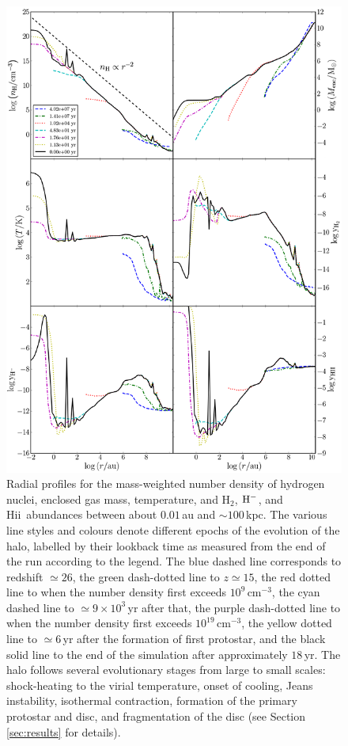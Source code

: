 \documentclass[useAMS,usenatbib]{mnras}
\newcommand{\cmmm}{\text{cm}^{-3}}
\newcommand{\HH}{\text{H}_2}          %
\newcommand{\HM}{{\rm H}^{-}}     %
\newcommand{\HII}{H{\sc ii}~}    %
\begin{document}
\begin{figure}
\begin{center}
\includegraphics[scale=0.9]{./f2.png}
\caption{Radial profiles for the mass-weighted number density of hydrogen nuclei, enclosed gas mass, temperature, and $\HH$, $\HM$, and \HII abundances between about $0.01\,$au and $\sim 100\,$kpc. The various line styles and colours denote different epochs of the evolution of the halo, labelled by their lookback time as measured from the end of the run according to the legend. The blue dashed line corresponds to redshift $\simeq 26$, the green dash-dotted line to $z \simeq 15$, the red dotted line to when the number density first exceeds $10^9\,\cmmm$, the cyan dashed line to $\simeq 9\times 10^3\,$yr after that, the purple dash-dotted line to when the number density first exceeds $10^{19}\,\cmmm$, the yellow dotted line to $\simeq 6\,$yr after the formation of first protostar, and the black solid line to the end of the simulation after approximately $18\,$yr. The halo follows several evolutionary stages from large to small scales: shock-heating to the virial temperature, onset of cooling, Jeans instability, isothermal contraction, formation of the primary protostar and disc, and fragmentation of the disc (see Section \ref{sec:results} for details).}
\label{fig:nh_enc_mass_temp_abH2}
\end{center}
\end{figure}
\end{document}
